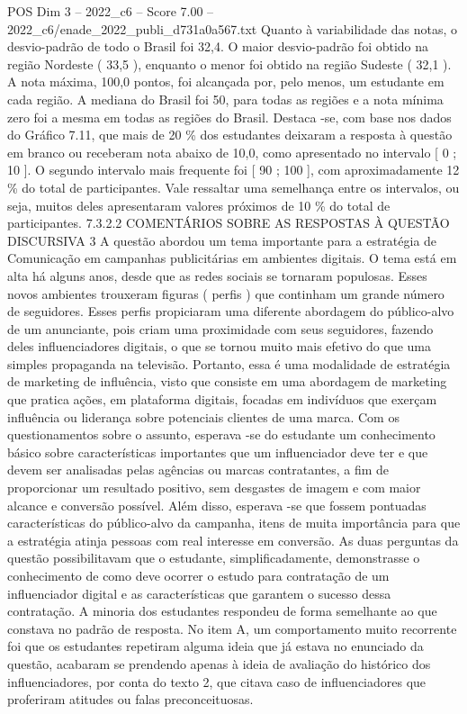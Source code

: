 \begin{textsample}{POS Dim 3 – 2022\_c6 – Score 7.00 – 2022\_c6/enade\_2022\_publi\_d731a0a567.txt}
Quanto à variabilidade das notas, o desvio-padrão de todo o Brasil foi 32,4.
O maior desvio-padrão foi obtido na região Nordeste ( 33,5 ), enquanto o menor foi obtido na região Sudeste ( 32,1 ).
A nota máxima, 100,0 pontos, foi alcançada por, pelo menos, um estudante em cada região.
A mediana do Brasil foi 50, para todas as regiões e a nota mínima zero foi a mesma em todas as regiões do Brasil.
Destaca -se, com base nos dados do Gráfico 7.11, que mais de 20 \% dos estudantes deixaram a resposta à questão em branco ou receberam nota abaixo de 10,0, como apresentado no intervalo [ 0 ; 10 ].
O segundo intervalo mais frequente foi [ 90 ; 100 ], com aproximadamente 12 \% do total de participantes.
Vale ressaltar uma semelhança entre os intervalos, ou seja, muitos deles apresentaram valores próximos de 10 \% do total de participantes. 7.3.2.2 COMENTÁRIOS SOBRE AS RESPOSTAS À QUESTÃO DISCURSIVA 3 A questão abordou um tema importante para a estratégia de Comunicação em campanhas publicitárias em ambientes digitais.
O tema está em alta há alguns anos, desde que as redes sociais se tornaram populosas.
Esses novos ambientes trouxeram figuras ( perfis ) que continham um grande número de seguidores.
Esses perfis propiciaram uma diferente abordagem do público-alvo de um anunciante, pois criam uma proximidade com seus seguidores, fazendo deles influenciadores digitais, o que se tornou muito mais efetivo do que uma simples propaganda na televisão.
Portanto, essa é uma modalidade de estratégia de marketing de influência, visto que consiste em uma abordagem de marketing que pratica ações, em plataforma digitais, focadas em indivíduos que exerçam influência ou liderança sobre potenciais clientes de uma marca.
Com os questionamentos sobre o assunto, esperava -se do estudante um conhecimento básico sobre características importantes que um influenciador deve ter e que devem ser analisadas pelas agências ou marcas contratantes, a fim de proporcionar um resultado positivo, sem desgastes de imagem e com maior alcance e conversão possível.
Além disso, esperava -se que fossem pontuadas características do público-alvo da campanha, itens de muita importância para que a estratégia atinja pessoas com real interesse em conversão.
As duas perguntas da questão possibilitavam que o estudante, simplificadamente, demonstrasse o conhecimento de como deve ocorrer o estudo para contratação de um influenciador digital e as características que garantem o sucesso dessa contratação.
A minoria dos estudantes respondeu de forma semelhante ao que constava no padrão de resposta.
No item A, um comportamento muito recorrente foi que os estudantes repetiram alguma ideia que já estava no enunciado da questão, acabaram se prendendo apenas à ideia de avaliação do histórico dos influenciadores, por conta do texto 2, que citava caso de influenciadores que proferiram atitudes ou falas preconceituosas.

\end{textsample}
